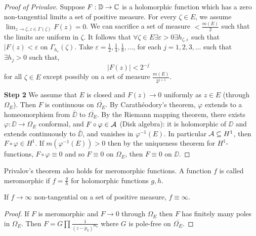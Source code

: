 \begin{proof}[Proof of Privalov]
	Suppose $F : \mathbb{D} \to \mathbb{C}$ is a holomorphic function which has a zero non-tangential limits a set of positive measure.
	For every $\zeta \in E$, we assume $\lim_{z \to \zeta, z \in \Gamma(\zeta)} F(z) = 0$.
	We can sacrifice a set of measure $< \frac{m(E)}{2}$ such that the limits are uniform in $\zeta$.
	It follows that $\forall \zeta \in E \exists \varepsilon > 0 \exists h_{\zeta, \varepsilon}$ such that $|F(z) < \varepsilon$ on $\Gamma_{h_{\varepsilon}}(\zeta)$.
	Take $\varepsilon = \frac{1}{2}, \frac{1}{4}, \frac{1}{8}, \ldots$, for each $j = 1, 2, 3, \ldots$ such that $\exists h_j > 0$ such that,
	\[
		|F(z)| < 2^{-j}
	\]
	for all $\zeta \in E$ except possibly on a set of measure $\frac{m(E)}{2^{j + 1}}$.

	\textbf{Step 2}
	We assume that $E$ is closed and $F(z) \to 0$ uniformly as $z \in E$ (through $\Omega_E$).
	Then $F$ is continuous on $\overline{\Omega_E}$.
	By Carathéodory's theorem, $\varphi$ extends to a homeomorphism from $\bar{\DD}$ to $\overline{\Omega_E}$.
	By the Riemann mapping theorem, there exists $\varphi : \DD \to \Omega_E$ conformal, and $F \circ \varphi \in \mathcal{A}$ (Disk algebra):
	it is holomorphic of $\DD$ and extends continuously to $\bar{\DD}$, and vanishes in $\varphi^{-1}(E)$.
	In particular $\mathcal{A} \subseteq H^1$, then $F \circ \varphi \in H^1$.
	If $m(\varphi^{-1}(E)) > 0$ then by the uniqueness theorem for $H^1$-functions, $F \circ \varphi \equiv 0$ and so $F \equiv 0$ on $\Omega_E$, then $F \equiv 0$ on $\DD$.
\end{proof}
\begin{remark}
	Privalov's theorem also holds for meromorphic functions.
	A function $f$ is called meromorphic if $f = \frac{g}{h}$ for holomorphic functions $g, h$.
\end{remark}
\begin{corollary}
	If $f \to \infty$ non-tangential on a set of positive measure, $f \equiv \infty$.
\end{corollary}
\begin{proof}
	If $F$ is meromorphic and $F \to 0$ through $\Omega_E$ then $F$ has finitely many poles in $\Omega_E$.
	Then $F = G \prod \frac{1}{{(z - p_k)}^{m_k}}$ where $G$ is pole-free on $\overline{\Omega_E}$.
\end{proof}

